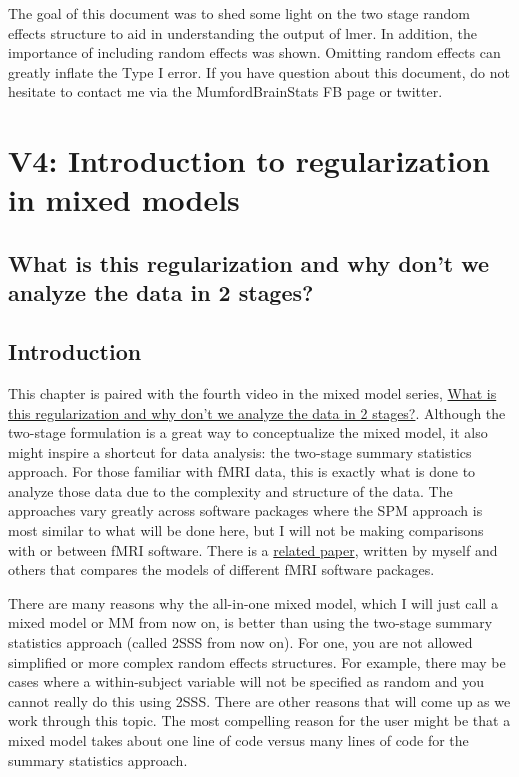 \documentclass[
]{book}
\begin{document}
The goal of this document was to shed some light on the two stage random effects structure to aid in understanding the output of lmer. In addition, the importance of including random effects was shown. Omitting random effects can greatly inflate the Type I error. If you have question about this document, do not hesitate to contact me via the MumfordBrainStats FB page or twitter.

\hypertarget{v4-introduction-to-regularization-in-mixed-models}{%
\chapter{V4: Introduction to regularization in mixed models}\label{v4-introduction-to-regularization-in-mixed-models}}

\hypertarget{what-is-this-regularization-and-why-dont-we-analyze-the-data-in-2-stages}{%
\section{What is this regularization and why don't we analyze the data in 2 stages?}\label{what-is-this-regularization-and-why-dont-we-analyze-the-data-in-2-stages}}

\hypertarget{introduction-2}{%
\section{Introduction}\label{introduction-2}}

This chapter is paired with the fourth video in the mixed model series, \href{https://youtu.be/sRhFeC-STdw}{What is this regularization and why don't we analyze the data in 2 stages?}. Although the two-stage formulation is a great way to conceptualize the mixed model, it also might inspire a shortcut for data analysis: the two-stage summary statistics approach. For those familiar with fMRI data, this is exactly what is done to analyze those data due to the complexity and structure of the data. The approaches vary greatly across software packages where the SPM approach is most similar to what will be done here, but I will not be making comparisons with or between fMRI software. There is a \href{https://www.ncbi.nlm.nih.gov/pubmed/19463958}{related paper}, written by myself and others that compares the models of different fMRI software packages.

There are many reasons why the all-in-one mixed model, which I will just call a mixed model or MM from now on, is better than using the two-stage summary statistics approach (called 2SSS from now on). For one, you are not allowed simplified or more complex random effects structures. For example, there may be cases where a within-subject variable will not be specified as random and you cannot really do this using 2SSS. There are other reasons that will come up as we work through this topic. The most compelling reason for the user might be that a mixed model takes about one line of code versus many lines of code for the summary statistics approach.
\end{document}
